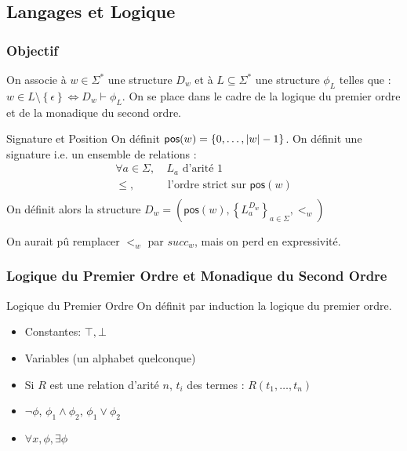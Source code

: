 \documentclass{cours}
\begin{document}
\subsection{Langages et Logique}
\subsubsection{Objectif}
On associe à $w \in \Sigma^{*}$ une structure $D_{w}$ et à $L \subseteq \Sigma^{*}$ une structure $\phi_{L}$ telles que : $w \in L\setminus \left\{\epsilon\right\} \Leftrightarrow D_{w} \vdash \phi_{L}$. On se place dans le cadre de la logique du premier ordre et de la monadique du second ordre.\\

\begin{définition}{Signature et Position}{}
    On définit $\textsf{pos}(w) = \left\{0, \ldots, \left|w\right| - 1\right\}$. On définit une signature i.e. un ensemble de relations : 
\[
    \begin{aligned}
        \forall a \in \Sigma,& \ L_{a} \text{ d'arité } 1\\
        \leq, & \text{ l'ordre strict sur } \textsf{pos}(w)\\
    \end{aligned}   
\]    
On définit alors la structure $D_{w} = \left(\textsf{pos}(w), \left\{L_{a}^{D_{w}}\right\}_{a \in \Sigma}, <_{w}\right)$
\end{définition}

\begin{remark}
    On aurait pû remplacer $<_{w}$ par $succ_{w}$, mais on perd en expressivité. 
\end{remark}

\subsubsection{Logique du Premier Ordre et Monadique du Second Ordre}
\begin{définition}{Logique du Premier Ordre}{}
    On définit par induction la logique du premier ordre.
    \begin{itemize}
        \item Constantes: $\top, \bot$
        \item Variables (un alphabet quelconque)
        \item Si $R$ est une relation d'arité $n$, $t_{i}$ des termes : $R(t_{1}, \ldots, t_{n})$ 
        \item $\lnot \phi$, $\phi_{1} \land \phi_{2}$, $\phi_{1} \lor \phi_{2}$
        \item $\forall x, \phi, \exists \phi$
    \end{itemize}
\end{définition}
\end{document}
